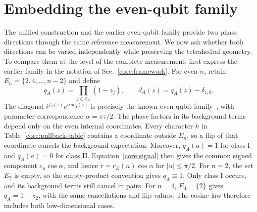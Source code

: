 \section{Embedding the even-qubit family}
\label{embed:section}

The unified construction and the earlier even-qubit family provide two phase directions through the same reference measurement. We now ask whether both directions can be varied independently while preserving the tetrahedral geometry. To compare them at the level of the complete measurement, first express the earlier family in the notation of Sec.~\ref{core:framework}. For even $n$, retain
$E_n=\{2,4,\ldots,n-2\}$ and define
\begin{equation}
 q_A(z)=\prod_{j\in E_n}(1-z_j),\qquad d_A(z)=q_A(z)-\delta_{z,0}.
 \label{embed:and-support}
\end{equation}
The diagonal $i^{f_0(z)}e^{i\alpha d_A(z)}$ is precisely the known even-qubit family~\cite{PauwelsGisin2026}, with parameter correspondence $\alpha=\pi\tau/2$. The phase factors in its background terms depend only on the even internal coordinates. Every character $h$ in Table~\ref{core:pullback-table} contains a coordinate outside $E_n$, so a flip of that coordinate cancels the background expectation. Moreover, $q_A(a)=1$ for class I and $q_A(a)=0$ for class II. Equation~\eqref{core:signal} then gives the common signed component $c_n\cos\alpha$, and hence $r=r_E(n)\cos\alpha$ for $|\alpha|\le\pi/2$. For $n=2$, the set $E_2$ is empty, so the empty-product convention gives $q_A\equiv1$. Only class I occurs, and its background terms still cancel in pairs. For $n=4$, $E_4=\{2\}$ gives $q_A=1-z_2$, with the same cancellations and flip values. The cosine law therefore includes both low-dimensional cases.

